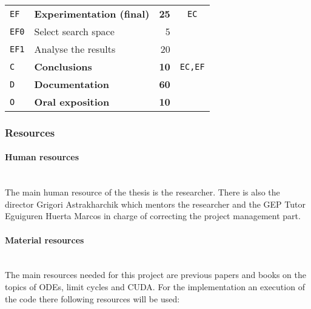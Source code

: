 \begin{table}[H]
\begin{tabular}{llrc}
    \addlinespace[0.5em]
    \texttt{EF} & \textbf{Experimentation (final)} & \textbf{25} & \texttt{EC} \\
        \texttt{EF0} & Select search space & 5 & \\
        \texttt{EF1} & Analyse the results & 20 & \\

    \addlinespace[0.5em]
        \texttt{C} & \textbf{Conclusions} & \textbf{10} & \texttt{EC,EF} \\
        \texttt{D} & \textbf{Documentation} & \textbf{60} & \\
        \texttt{O} & \textbf{Oral exposition} & \textbf{10} & \\
        \bottomrule
    \end{tabular}
\end{table}

\pagebreak
\subsubsection{Resources}

\paragraph{Human resources}\mbox{}\\

The main human resource of the thesis is the researcher.  There is also the
director Grigori Astrakharchik which mentors the researcher and the GEP Tutor
Eguiguren Huerta Marcos in charge of correcting the project management part.

\paragraph{Material resources}\mbox{}\\

The main resources needed for this project are previous papers and books on the
topics of ODEs, limit cycles and CUDA. For the implementation an execution of
the code there following resources will be used:

